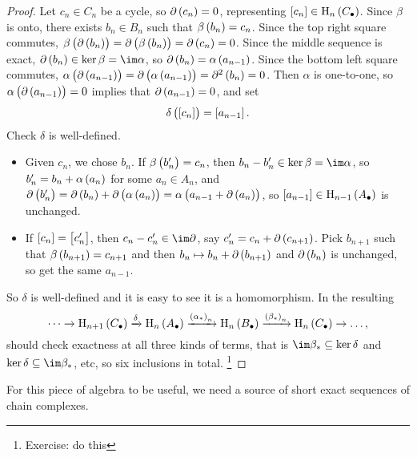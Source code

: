 \begin{proof}
Let $ c_n \in C_n $ be a cycle, so $ \da\br{c_n} = 0 $, representing $ \sbr{c_n} \in \H_n\br{C_\bullet} $. Since $ \beta $ is onto, there exists $ b_n \in B_n $ such that $ \beta\br{b_n} = c_n $. Since the top right square commutes, $ \beta\br{\da\br{b_n}} = \da\br{\beta\br{b_n}} = \da\br{c_n} = 0 $. Since the middle sequence is exact, $ \da\br{b_n} \in \ker \beta = \im \alpha $, so $ \da\br{b_n} = \alpha\br{a_{n - 1}} $. Since the bottom left square commutes, $ \alpha\br{\da\br{a_{n - 1}}} = \da\br{\alpha\br{a_{n - 1}}} = \da^2\br{b_n} = 0 $. Then $ \alpha $ is one-to-one, so $ \alpha\br{\da\br{a_{n - 1}}} = 0 $ implies that $ \da\br{a_{n - 1}} = 0 $, and set
$$ \delta\br{\sbr{c_n}} = \sbr{a_{n - 1}}. $$
Check $ \delta $ is well-defined.
\begin{itemize}
\item Given $ c_n $, we chose $ b_n $. If $ \beta\br{b_n'} = c_n $, then $ b_n - b_n' \in \ker \beta = \im \alpha $, so $ b_n' = b_n + \alpha\br{a_n} $ for some $ a_n \in A_n $, and $ \da\br{b_n'} = \da\br{b_n} + \da\br{\alpha\br{a_n}} = \alpha\br{a_{n - 1} + \da\br{a_n}} $, so $ \sbr{a_{n - 1}} \in \H_{n - 1}\br{A_\bullet} $ is unchanged.
\item If $ \sbr{c_n} = \sbr{c_n'} $, then $ c_n - c_n' \in \im \da $, say $ c_n' = c_n + \da\br{c_{n + 1}} $. Pick $ b_{n + 1} $ such that $ \beta\br{b_{n + 1}} = c_{n + 1} $ and then $ b_n \mapsto b_n + \da\br{b_{n + 1}} $ and $ \da\br{b_n} $ is unchanged, so get the same $ a_{n - 1} $.
\end{itemize}
So $ \delta $ is well-defined and it is easy to see it is a homomorphism. In the resulting
$$ \dots \to \H_{n + 1}\br{C_\bullet} \xrightarrow{\delta} \H_n\br{A_\bullet} \xrightarrow{\br{\alpha_*}_n} \H_n\br{B_\bullet} \xrightarrow{\br{\beta_*}_n} \H_n\br{C_\bullet} \to \dots, $$
should check exactness at all three kinds of terms, that is $ \im \beta_* \subseteq \ker \delta $ and $ \ker \delta \subseteq \im \beta_* $, etc, so six inclusions in total. \footnote{Exercise: do this}
\end{proof}

For this piece of algebra to be useful, we need a source of short exact sequences of chain complexes.

